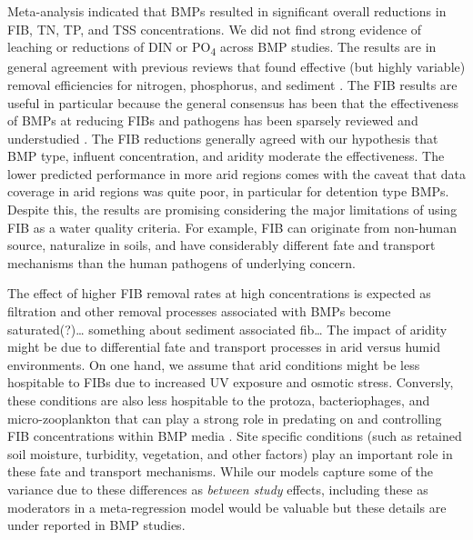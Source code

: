 \documentclass[utf8]{FrontiersinHarvard}
\begin{document}
Meta-analysis indicated that BMPs resulted in significant overall reductions in FIB, TN, TP, and TSS concentrations.
We did not find strong evidence of leaching or reductions of DIN or PO\textsubscript{4} across BMP studies.
The results are in general agreement with previous reviews that found effective (but highly variable) removal efficiencies for nitrogen, phosphorus, and sediment \citep{claryBMPPerformanceAnalysis2011, kochNitrogenRemovalStormwater2014, liuReviewEffectivenessBest2017}.
The FIB results are useful in particular because the general consensus has been that the effectiveness of BMPs at reducing FIBs and pathogens has been sparsely reviewed and understudied \citep{hagerPerformanceLowimpactDevelopment2019}.
The FIB reductions generally agreed with our hypothesis that BMP type, influent concentration, and aridity moderate the effectiveness.
The lower predicted performance in more arid regions comes with the caveat that data coverage in arid regions was quite poor, in particular for detention type BMPs.
Despite this, the results are promising considering the major limitations of using FIB as a water quality criteria.
For example, FIB can originate from non-human source, naturalize in soils, and have considerably different fate and transport mechanisms than the human pathogens of underlying concern.

The effect of higher FIB removal rates at high concentrations is expected as filtration and other removal processes associated with BMPs become saturated(?)\ldots{} something about sediment associated fib\ldots{}
The impact of aridity might be due to differential fate and transport processes in arid versus humid environments.
On one hand, we assume that arid conditions might be less hospitable to FIBs due to increased UV exposure and osmotic stress.
Conversly, these conditions are also less hospitable to the protoza, bacteriophages, and micro-zooplankton that can play a strong role in predating on and controlling FIB concentrations within BMP media \citep{zhangCaptureDestructionEscherichia2010, burtchettMicrozooplanktonGrazingMeans2017, deanMetaanalysisAddressingImplications2022}.
Site specific conditions (such as retained soil moisture, turbidity, vegetation, and other factors) play an important role in these fate and transport mechanisms.
While our models capture some of the variance due to these differences as \emph{between study} effects, including these as moderators in a meta-regression model would be valuable but these details are under reported in BMP studies.
\end{document}
